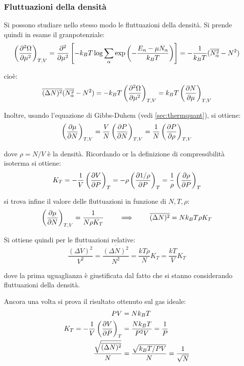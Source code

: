 \subsubsection{Fluttuazioni della densità}
Si possono studiare nello stesso modo le fluttuazioni della densità. Si prende quindi in esame il granpotenziale:
\begin{equation*}
\left(\frac{\partial {^2 \Omega}}{\partial {\mu^2}}\right)_{T,V} = \frac{\partial {^2}}{\partial {\mu^2}} \left[ -k_B T \log \sum_{\alpha} \exp \left(- \frac{E_\alpha - \mu N_\alpha}{k_B T}\right)\right] = - \frac{1}{k_B T} (\overline{N_\alpha^2} - N^2)
\end{equation*}

\noindent cioè:
\begin{equation*}
\overline{(\Delta N)^2}(\overline{N_\alpha^2} - N^2) = - k_B T \left(\frac{\partial {^2 \Omega}}{\partial {\mu^2}}\right)_{T,V} = k_B T \left(\frac{\partial {N}}{\partial {\mu}}\right)_{T,V}
\end{equation*}

Inoltre, usando l'equazione di Gibbs-Duhem (vedi \cref{sec:thermquant}), si ottiene:
\begin{equation*}
\left(\frac{\partial {\mu}}{\partial {N}}\right)_{T,V} = \frac{V}{N} \left(\frac{\partial {P}}{\partial {N}}\right)_{T,V} = \frac{1}{N} \left(\frac{\partial {P}}{\partial {\rho}}\right)_{T,V}
\end{equation*}

\noindent dove $\rho = N/V$ è la densità. Ricordando or la definizione di compressibilità isoterma si ottiene:
\begin{equation*}
	K_T = - \frac{1}{V} \left(\frac{\partial {V}}{\partial {P}}\right)_{T} = - \rho \left(\frac{\partial {1/\rho}}{\partial {P}}\right)_{T} = \frac{1}{\rho} \left(\frac{\partial {\rho}}{\partial {P}}\right)_{T}
\end{equation*}

\noindent si trova infine il valore delle fluttuazioni in funzione di $N,T,\rho$:
\begin{equation*}
	\left(\frac{\partial {\mu}}{\partial {N}}\right)_{T,V} = \frac{1}{N \rho K_T} \qquad \implies \qquad \overline{(\Delta N)^2} = N k_B T \rho K_T
\end{equation*}

Si ottiene quindi per le fluttuazioni relative:
\begin{equation*}
	\frac{\overline{(\Delta V)^2}}{V^2} = \frac{\overline{(\Delta N)^2}}{N^2} = \frac{kT\rho}{N} K_T = \frac{kT}{V} K_T
\end{equation*}

\noindent dove la prima uguaglianza è giustificata dal fatto che si stanno considerando fluttuazioni della densità.

Ancora una volta si prova il risultato ottenuto sul gas ideale:
\begin{align*}
PV &= Nk_B T\\
K_T = - \frac{1}{V} \left(\frac{\partial {V}}{\partial {P}}\right)_{T} &= \frac{N k_B T}{P^2 V} = \frac{1}{P}\\
\frac{\sqrt{\overline{(\Delta N)^2}}}{N} &= \frac{\sqrt{k_B T / PV}}{N} = \frac{1}{\sqrt{N}}
\end{align*}

